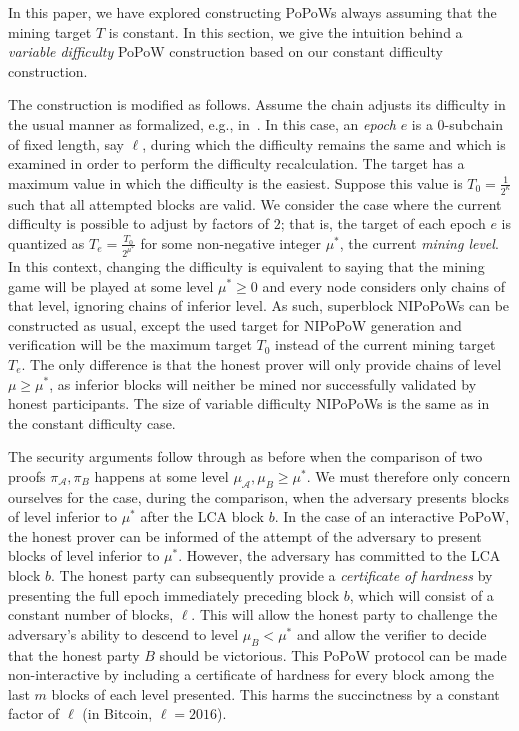 \label{sec:variable}

In this paper, we have explored constructing PoPoWs always assuming that the
mining target $T$ is constant. In this section, we give the intuition behind a
\emph{variable difficulty} PoPoW construction based on our constant difficulty
construction.

The construction is modified as follows. Assume the chain adjusts its difficulty
in the usual manner as formalized, e.g., in~\cite{backbone2}. In this case, an
\emph{epoch} $e$ is a $0$-subchain of fixed length, say $\ell$, during which the
difficulty remains the same and which is examined in order to perform the
difficulty recalculation. The target has a maximum value in which the difficulty
is the easiest. Suppose this value is $T_0 = \frac{1}{2^\kappa}$ such that all
attempted blocks are valid. We consider the case where the current difficulty is
possible to adjust by factors of $2$; that is, the target of each epoch $e$ is
quantized as $T_e = \frac{T_0}{2^{\mu^*}}$ for some non-negative integer
$\mu^*$, the current \emph{mining level}. In this context, changing the
difficulty is equivalent to saying that the mining game will be played at some
level $\mu^* \geq 0$ and every node considers only chains of that level,
ignoring chains of inferior level. As such, superblock NIPoPoWs can be
constructed as usual, except the used target for NIPoPoW generation and
verification will be the maximum target $T_0$ instead of the current mining
target $T_e$. The only difference is that the honest prover will only provide
chains of level $\mu \geq \mu^*$, as inferior blocks will neither be mined nor
successfully validated by honest participants. The size of variable difficulty
NIPoPoWs is the same as in the constant difficulty case.

The security arguments follow through as before when the comparison of two
proofs $\pi_\mathcal{A}, \pi_B$ happens at some level $\mu_\mathcal{A}, \mu_B
\geq \mu^*$. We must therefore only concern ourselves for the case, during the
comparison, when the adversary presents blocks of level inferior to $\mu^*$
after the LCA block $b$. In the case of an interactive PoPoW, the honest prover
can be informed of the attempt of the adversary to present blocks of level
inferior to $\mu^*$. However, the adversary has committed to the LCA block $b$.
The honest party can subsequently provide a \emph{certificate of hardness} by
presenting the full epoch immediately preceding block $b$, which will consist of
a constant number of blocks, $\ell$. This will allow the honest party to
challenge the adversary's ability to descend to level $\mu_B < \mu^*$ and allow
the verifier to decide that the honest party $B$ should be victorious. This
PoPoW protocol can be made non-interactive by including a certificate of
hardness for every block among the last $m$ blocks of each level presented. This
harms the succinctness by a constant factor of $\ell$ (in Bitcoin,
$\ell = 2016$).

